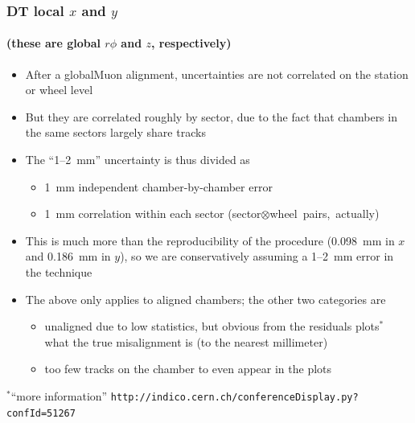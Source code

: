 \documentclass[compress]{beamer}
\begin{document}

\begin{frame}
\frametitle{DT local $x$ and $y$}
\framesubtitle{(these are global $r\phi$ and $z$, respectively)}
\begin{itemize}
\item After a globalMuon alignment, uncertainties are not correlated on the station or wheel level
\item But they are correlated roughly by sector, due to the fact that
  chambers in the same sectors largely share tracks
\item The ``1--2~mm'' uncertainty is thus divided as
\begin{itemize}
\item 1~mm independent chamber-by-chamber error
\item 1~mm correlation within each sector \mbox{(sector$\otimes$wheel pairs, actually)\hspace{-2 cm}}
\end{itemize}
\item This is much more than the reproducibility of the procedure
  (0.098~mm in $x$ and 0.186~mm in $y$), so we are conservatively
  assuming a 1--2~mm error in the technique
\item The above only applies to aligned chambers; the other two categories are
\begin{itemize}
\item unaligned due to low statistics, but obvious from the residuals
  plots$^*$ what the true misalignment is (to the nearest millimeter)
\item too few tracks on the chamber to even appear in the plots
\end{itemize}
\end{itemize}

$^*$``more information'' \mbox{\tt \scriptsize http://indico.cern.ch/conferenceDisplay.py?confId=51267\hspace{-2 cm}}
\end{frame}
\end{document}
